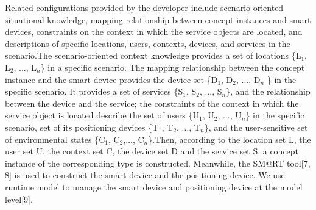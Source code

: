 Related configurations provided by the developer include scenario-oriented situational knowledge, mapping relationship between concept instances and smart devices, constraints on the context in which the service objects are located, and descriptions of specific locations, users, contexts, devices, and services in the scenario.The scenario-oriented context knowledge provides a set of locations \{L$_{1}$, L$_{2}$, ..., L$_{n}$\} in a specific scenario. The mapping relationship between the concept instance and the smart device provides the device set \{D$_{1}$, D$_{2}$, ..., D$_{n}$ \} in the specific scenario. It provides a set of services \{S$_{1}$, S$_{2}$, ..., S$_{n}$\}, and the relationship between the device and the service; the constraints of the context in which the service object is located describe the set of users \{U$_{1}$, U$_{2}$, ..., U$_{n}$\} in the specific scenario, set of its positioning devices \{T$_{1}$, T$_{2}$, ..., T$_{n}$\}, and the user-sensitive set of environmental states \{C$_{1}$, C$_{2}$,..., C$_{n}$\}.Then, according to the location set L, the user set U, the context set C, the device set D and the service set S, a concept instance of the corresponding type is constructed. Meanwhile, the SM@RT tool[7, 8] is used to construct the smart device and the positioning device. We use runtime model to manage the smart device and positioning device at the model level[9].

